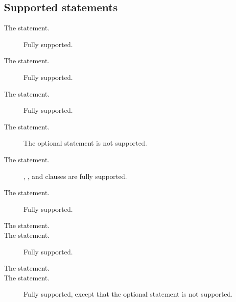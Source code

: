 \documentclass{howto}
\begin{document}
\subsection{Supported statements}
\begin{description}

\item[The  statement.]
Fully supported.

\item[The  statement.]
Fully supported.

\item[The  statement.]
Fully supported.

\item[The  statement.]
The optional 
statement is not supported.

\item[The  statement.]
, , and  clauses
are fully supported.

\item[The  statement.] Fully supported.

\item[The  statement.]

\item[The  statement.]
Fully supported.

\item[The  statement.] 

\item[The  statement.]
Fully supported, except that the optional 
statement is not supported.

\end{description}
\end{document}
